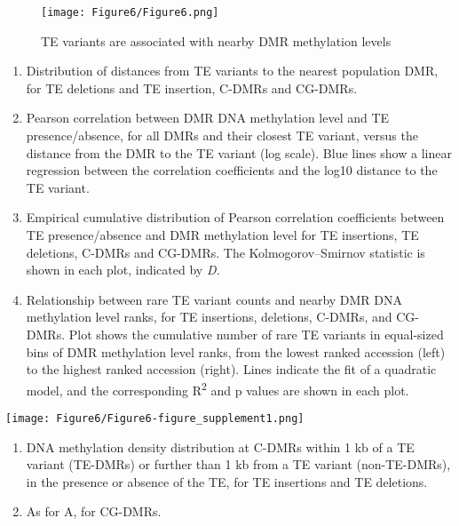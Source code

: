 \documentclass[12pt]{article}
\begin{document}
\pagebreak


\begin{figure}[!ht]
  \centering
  \texttt{[image: Figure6/Figure6.png]}
  \caption{TE variants are associated with nearby DMR methylation levels}
  \label{fig6}
\end{figure}


\begin{enumerate}
\def\labelenumi{(\Alph{enumi})}
\item
  Distribution of distances from TE variants to the nearest population
  DMR, for TE deletions and TE insertion, C-DMRs and CG-DMRs.
\item
  Pearson correlation between DMR DNA methylation level and TE
  presence/absence, for all DMRs and their closest TE variant, versus
  the distance from the DMR to the TE variant (log scale). Blue lines
  show a linear regression between the correlation coefficients and the
  log10 distance to the TE variant.
\item
  Empirical cumulative distribution of Pearson correlation coefficients
  between TE presence/absence and DMR methylation level for TE
  insertions, TE deletions, C-DMRs and CG-DMRs. The Kolmogorov--Smirnov
  statistic is shown in each plot, indicated by \emph{D.}
\item
  Relationship between rare TE variant counts and nearby DMR DNA
  methylation level ranks, for TE insertions, deletions, C-DMRs, and
  CG-DMRs. Plot shows the cumulative number of rare TE variants in
  equal-sized bins of DMR methylation level ranks, from the lowest
  ranked accession (left) to the highest ranked accession (right). Lines
  indicate the fit of a quadratic model, and the corresponding R\textsuperscript{2} and p
  values are shown in each plot.
\end{enumerate}

\pagebreak


\setcounter{suppfigure}{5}

\begin{suppfigure}
  \centering
  \texttt{[image: Figure6/Figure6-figure\_supplement1.png]}
  \caption{figure supplement 1}
  \label{fig6s1}
\end{suppfigure}

\begin{enumerate}
\def\labelenumi{(\Alph{enumi})}
\item
  DNA methylation density distribution at C-DMRs within 1 kb of a TE
  variant (TE-DMRs) or further than 1 kb from a TE variant
  (non-TE-DMRs), in the presence or absence of the TE, for TE insertions
  and TE deletions.
\item
  As for A, for CG-DMRs.
\end{enumerate}
\end{document}
